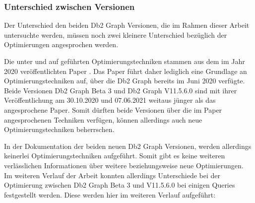 \subsubsection{Unterschied zwischen Versionen}
\label{subsubsec:optimierung:unterschied_versionen}
Der Unterschied den beiden Db2 Graph Versionen, die im Rahmen dieser Arbeit untersuchte werden, müssen noch zwei kleinere Unterschied bezüglich der Optimierungen angesprochen werden. 

Die unter  und  auf geführten Optimierungstechniken stammen aus dem im Jahr 2020 veröffentlichten Paper \cite{sigmod_tian}. Das Paper führt daher lediglich eine Grundlage an Optimierungstechniken auf, über die Db2 Graph bereits im Juni 2020 verfügte. Beide Versionen Db2 Graph Beta 3 und Db2 Graph V11.5.6.0 sind mit ihrer Veröffentlichung am 30.10.2020 und 07.06.2021 weitaus jünger als das angesprochene Paper. Somit dürften beide Versionen über die im Paper angesprochenen Techniken verfügen, können allerdings auch neue Optimierungstechniken beherrschen. 

In der Dokumentation der beiden neuen Db2 Graph Versionen, werden allerdings keinerlei Optimierungstechniken aufgeführt. Somit gibt es keine weiteren verlässlichen Informationen über weitere beziehungsweise neue Optimierungen. Im weiteren Verlauf der Arbeit konnten allerdings Unterschiede bei der Optimierung zwischen Db2 Graph Beta 3 und V11.5.6.0 bei einigen Queries festgestellt werden. Diese werden hier im weiteren Verlauf aufgeführt:

